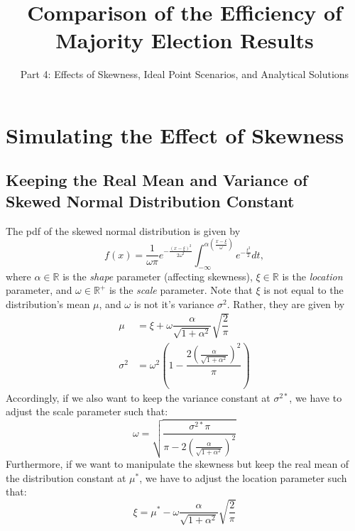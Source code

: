 \documentclass[12pt]{scrartcl}\usepackage[]{graphicx}\usepackage[]{color}
\title{Comparison of the Efficiency of Majority Election Results}
\subtitle{Part 4: Effects of Skewness, Ideal Point Scenarios, and Analytical Solutions}
\author{}
\begin{document}
\maketitle

\section{Simulating the Effect of Skewness}

\subsection{Keeping the Real Mean and Variance of Skewed Normal Distribution Constant}

The pdf of the skewed normal distribution is given by
\begin{equation}
f(x)=\dfrac{1}{\omega\pi}e^{-\tfrac{(x-\xi)^2}{2\omega^2}}
\int_{-\infty}^{\alpha\left(\tfrac{x-\xi}{\omega}\right)}
e^{-\tfrac{t^2}{2}}dt,
\end{equation}
where $\alpha \in \mathbb{R}$ is the \textit{shape} parameter (affecting skewness), $\xi \in \mathbb{R}$ is the \textit{location} parameter, and $\omega \in \mathbb{R^+}$ is the \textit{scale} parameter. Note that $\xi$ is not equal to the distribution's mean $\mu$, and $\omega$ is not it's variance $\sigma^2$. Rather, they are given by
\begin{align}
\mu &= \xi + \omega\dfrac{\alpha}{\sqrt{1+\alpha^2}}\sqrt{\dfrac{2}{\pi}} \\
\sigma^2 &= \omega^2 \left(1-\dfrac{2\left(\tfrac{\alpha}{\sqrt{1+\alpha^2}}\right)^2}{\pi}\right)
\end{align}
Accordingly, if we also want to keep the variance constant at $\sigma^{2*}$, we have to adjust the scale parameter such that:
\begin{equation}
\omega = \sqrt{\dfrac{\sigma^{2*}\pi}{\pi-2\left(\tfrac{\alpha}{\sqrt{1+\alpha^2}}\right)^2}}
\end{equation}
Furthermore, if we want to manipulate the skewness but keep the real mean of the distribution constant at $\mu^*$, we have to adjust the location parameter such that:
\begin{equation}
\xi = \mu^* - \omega\dfrac{\alpha}{\sqrt{1+\alpha^2}}\sqrt{\dfrac{2}{\pi}}
\end{equation}
\end{document}
